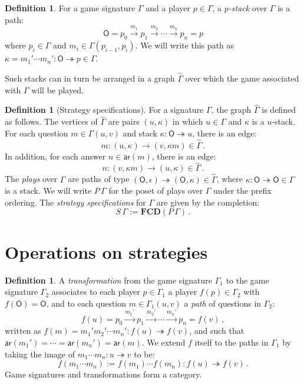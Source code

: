 \documentclass[draft,11pt]{report}
\theoremstyle{definition}
\newtheorem{definition}[theorem]{Definition}
\newcommand{\kw}[1]{\ensuremath{ \mathsf{#1} }}
\begin{document}
\begin{definition}
For a game signature $\Gamma$ and a player $p \in \Gamma$,
a \emph{$p$-stack} over $\Gamma$ is a path:
\[
  \kw{O} = p_0 \xrightarrow{m_1} p_1 \xrightarrow{m_2} \cdots
             \xrightarrow{m_n} p_n = p
\]
where $p_i \in \Gamma$ and $m_i \in \Gamma(p_{i-1}, p_i)$.
We will write this path as
$\kappa = m_1' \cdots m_n' : \kw{O} \twoheadrightarrow p 
 \in \Gamma$.
\end{definition}

Such stacks can in turn be arranged in a graph $\hat{\Gamma}$
over which the game associated with $\Gamma$ will be played.

\begin{definition}[Strategy specifications] %
For a signature $\Gamma$,
the graph $\hat{\Gamma}$ is defined as follows.
The vertices of $\hat{\Gamma}$ are pairs $(u, \kappa)$
in which $u \in \Gamma$ and $\kappa$ is a $u$-stack.
For each question $m \in \Gamma(u,v)$
and stack $\kappa : \kw{O} \twoheadrightarrow u$,
there is an edge:
\[
    m : (u, \kappa) \rightarrow (v, \kappa m) \in \hat{\Gamma} \,.
\]
In addition, for each answer $n \in \kw{ar}(m)$,
there is an edge:
\[
    n : (v, \kappa m) \rightarrow (u, \kappa) \in \hat{\Gamma} \,.
\]
The \emph{plays} over $\Gamma$
are paths of type
$(\kw{O}, \epsilon) \twoheadrightarrow (\kw{O}, \kappa)
 \in \hat{\Gamma}$,
where $\kappa : \kw{O} \twoheadrightarrow \kw{O} \in \Gamma$
is a stack.
We will write
$P \, \Gamma$
for the poset of plays over $\Gamma$
under the prefix ordering.
The \emph{strategy specifications} for $\Gamma$
are given by the completion:
\[
    S \, \Gamma := \mathbf{FCD}(P \, \Gamma) \,.
\]
\end{definition}


\section{Operations on strategies} %

\begin{definition}
A \emph{transformation}
from the game signature $\Gamma_1$
to the game signature $\Gamma_2$
associates to each player $p \in \Gamma_1$ a player $f(p) \in \Gamma_2$
with $f(\kw{O}) = \kw{O}$,
and to each question $m \in \Gamma_1(u,v)$
a \emph{path} of questions in $\Gamma_2$:
\[
  f(u) = p_0 \xrightarrow{m_1'} p_1 \xrightarrow{m_2'} \cdots
             \xrightarrow{m_n'} p_n = f(v) \,,
\]
written as
$f(m) = m_1' m_2' \cdots m_n' : f(u) \twoheadrightarrow f(v)$, and
such that
$\kw{ar}(m_1') = \cdots = \kw{ar}(m_n') = \kw{ar}(m)$.
We extend $f$ itself to the paths in $\Gamma_1$
by taking the image of $m_1 \cdots m_n : u \twoheadrightarrow v$
to be:
\[
  f(m_1 \cdots m_n) := f(m_1) \cdots f(m_n) :
    f(u) \twoheadrightarrow f(v) \,.
\]
Game signatures and transformations form a category.
\end{definition}
\end{document}
